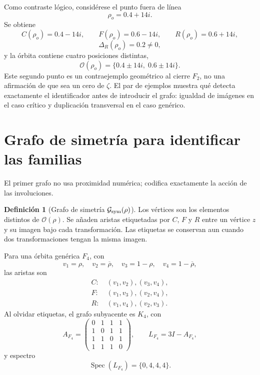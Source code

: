 \documentclass[11pt]{amsart}
\theoremstyle{definition}
\newtheorem{definition}[theorem]{Definición}
\theoremstyle{remark}
\begin{document}
Como contraste lógico, considérese el punto fuera de línea
\[
\rho_o=0.4+14i.
\]
Se obtiene
\[
C(\rho_o)=0.4-14i,\qquad F(\rho_o)=0.6-14i,\qquad R(\rho_o)=0.6+14i,
\]
\[
\Delta_R(\rho_o)=0.2\neq0,
\]
y la órbita contiene cuatro posiciones distintas,
\[
\mathcal O(\rho_o)=\{0.4\pm14i,\;0.6\pm14i\}.
\]
Este segundo punto es un contraejemplo geométrico al cierre $F_2$, no una afirmación de que sea un cero de $\zeta$. El par de ejemplos muestra qué detecta exactamente el identificador antes de introducir el grafo: igualdad de imágenes en el caso crítico y duplicación transversal en el caso genérico.

\section{Grafo de simetría para identificar las familias}
El primer grafo no usa proximidad numérica; codifica exactamente la acción de las involuciones.

\begin{definition}[Grafo de simetría $\mathcal G_{\rm sym}(\rho)$]
Los vértices son los elementos distintos de $\mathcal O(\rho)$. Se añaden aristas etiquetadas por $C$, $F$ y $R$ entre un vértice $z$ y su imagen bajo cada transformación. Las etiquetas se conservan aun cuando dos transformaciones tengan la misma imagen.
\end{definition}

Para una órbita genérica $F_4$, con
\[
v_1=\rho,\quad v_2=\overline\rho,\quad v_3=1-\rho,\quad v_4=1-\overline\rho,
\]
las aristas son
\begin{align*}
C:&\ (v_1,v_2),(v_3,v_4),\\
F:&\ (v_1,v_3),(v_2,v_4),\\
R:&\ (v_1,v_4),(v_2,v_3).
\end{align*}
Al olvidar etiquetas, el grafo subyacente es $K_4$, con
\begin{equation}
A_{F_4}=\begin{pmatrix}
0&1&1&1\\1&0&1&1\\1&1&0&1\\1&1&1&0
\end{pmatrix},\qquad
L_{F_4}=3I-A_{F_4},
\end{equation}
y espectro
\begin{equation}
 \operatorname{Spec}(L_{F_4})=\{0,4,4,4\}.
\end{equation}
\end{document}
